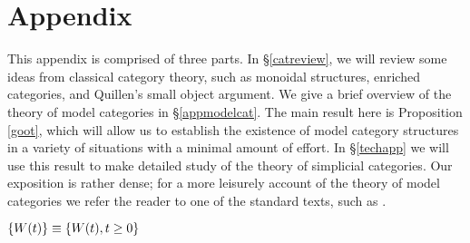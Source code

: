 \documentclass{report}[10pt, final]
\theoremstyle{definition}
\begin{document}




\appendix

\chapter{Appendix}

\setcounter{theorem}{0}
\setcounter{subsection}{0}

This appendix is comprised of three parts. In \S \ref{catreview}, we will review some ideas from classical category theory, such as monoidal structures, enriched categories, and Quillen's small object argument. We give a brief overview of the theory of model categories in \S \ref{appmodelcat}.
The main result here is Proposition \ref{goot}, which will allow us to establish the existence of model category structures in a variety of situations with a minimal amount of effort. In \S \ref{techapp} we will use this result to make detailed study of the theory of simplicial categories.
Our exposition is rather dense; for a more leisurely account of the theory of model categories we refer the reader to one of the standard texts, such as \cite{hovey}.

$\{W(t)\}\equiv \{W(t),t\geq 0\}\glossary{Wt@$W(t)$ & State or window
size of the source at time $t$}$


\end{document}
